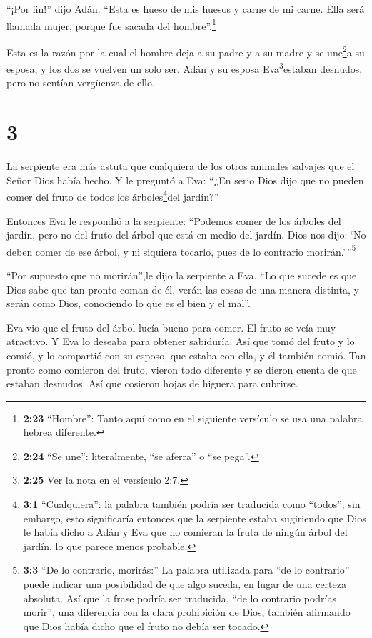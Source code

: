  ``¡Por fin!'' dijo Adán. ``Esta es hueso de mis huesos y
carne de mi carne. Ella será llamada mujer, porque fue sacada del
hombre''.\footnote{\textbf{2:23} ``Hombre'': Tanto aquí como en el
  siguiente versículo se usa una palabra hebrea diferente.}

 Esta es la razón por la cual el hombre deja a su padre y a
su madre y se une\footnote{\textbf{2:24} ``Se une'': literalmente, ``se
  aferra'' o ``se pega''.}a su esposa, y los dos se vuelven un solo ser.
 Adán y su esposa Eva\footnote{\textbf{2:25} Ver la nota en
  el versículo 2:7.}estaban desnudos, pero no sentían vergüenza de ello.

\hypertarget{section-2}{%
\section{3}\label{section-2}}

 La serpiente era más astuta que cualquiera de los otros
animales salvajes que el Señor Dios había hecho. Y le preguntó a Eva:
``¿En serio Dios dijo que no pueden comer del fruto de todos los
árboles\footnote{\textbf{3:1} ``Cualquiera'': la palabra también podría
  ser traducida como ``todos''; sin embargo, esto significaría entonces
  que la serpiente estaba sugiriendo que Dios le había dicho a Adán y
  Eva que no comieran la fruta de ningún árbol del jardín, lo que parece
  menos probable.}del jardín?''

 Entonces Eva le respondió a la serpiente: ``Podemos comer
de los árboles del jardín, pero no del fruto del árbol que está en medio
del jardín.  Dios nos dijo: `No deben comer de ese árbol, y
ni siquiera tocarlo, pues de lo contrario morirán.'\,''\footnote{\textbf{3:3}
  ``De lo contrario, morirás:'' La palabra utilizada para ``de lo
  contrario'' puede indicar una posibilidad de que algo suceda, en lugar
  de una certeza absoluta. Así que la frase podría ser traducida, ``de
  lo contrario podrías morir'', una diferencia con la clara prohibición
  de Dios, también afirmando que Dios había dicho que el fruto no debía
  ser tocado.}

 ``Por supuesto que no morirán'',le dijo la serpiente a Eva.
 ``Lo que sucede es que Dios sabe que tan pronto coman de
él, verán las cosas de una manera distinta, y serán como Dios,
conociendo lo que es el bien y el mal''.

 Eva vio que el fruto del árbol lucía bueno para comer. El
fruto se veía muy atractivo. Y Eva lo deseaba para obtener sabiduría.
Así que tomó del fruto y lo comió, y lo compartió con su esposo, que
estaba con ella, y él también comió.  Tan pronto como
comieron del fruto, vieron todo diferente y se dieron cuenta de que
estaban desnudos. Así que cosieron hojas de higuera para cubrirse.


